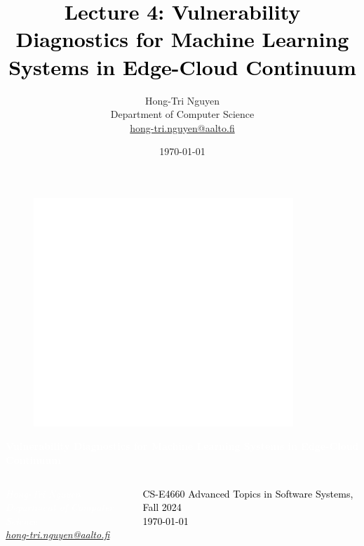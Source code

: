 \documentclass[aspectratio=169]{beamer}
\title{\textcolor{black}{\textbf{Lecture 4:  Vulnerability Diagnostics for Machine Learning Systems in Edge-Cloud Continuum}}}
\author{Hong-Tri Nguyen\\ Department of Computer Science\\ \url{hong-tri.nguyen@aalto.fi}}
\date{\today}
\begin{document}

\logo{}
{
\begin{frame}
     \begin{figure}
        \hspace{-13cm}
        \vspace{1cm}
        \includegraphics[scale=0.3]{img/aalto-white.pdf}
    \end{figure}
  \textcolor{white}{\LARGE{\textbf{Vulnerability Diagnostics for Machine Learning Systems in Edge-Cloud Continuum}}}\\
  \vspace{0.5cm}
  \begin{columns}
      \begin{column}{0.58\textwidth}
          \fontsize{10pt}{3pt}\selectfont\textcolor{white}{\textit{Hong-Tri Nguyen\\ Department of Computer Science}}\\
          
          \textit{\href{emailto:hong-tri.nguyen@aalto.fi}{hong-tri.nguyen@aalto.fi}}
      \end{column}
      \hspace{-2cm}
      \begin{column}{0.5\textwidth}
        \begin{FlushRight}
          \fontsize{6pt}{4pt}\selectfont\textcolor{black}{CS-E4660 Advanced Topics in Software Systems, Fall 2024\\\today}
        \end{FlushRight}
      \end{column}
  \end{columns}
  
\end{frame}
}
\end{document}
